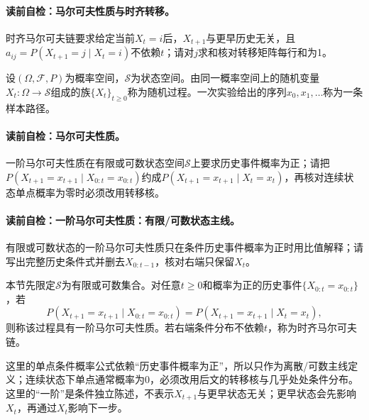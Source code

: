 \paragraph{读前自检：马尔可夫性质与时齐转移。}时齐马尔可夫链要求给定当前$X_t=i$后，$X_{t+1}$与更早历史无关，且$a_{ij}=P(X_{t+1}=j\mid X_t=i)$不依赖$t$；请对$j$求和核对转移矩阵每行和为1。\par

\label{struct:V5-C01-CH07}
\begin{definition}[随机过程]
设$(\Omega,\mathcal F,P)$为概率空间，$\mathcal S$为状态空间。由同一概率空间上的随机变量$X_t:\Omega\to\mathcal S$组成的族$\{X_t\}_{t\ge0}$称为随机过程。一次实验给出的序列$x_0,x_1,\ldots$称为一条样本路径。
\end{definition}

\paragraph{读前自检：马尔可夫性质。}一阶马尔可夫性质在有限或可数状态空间$\mathcal S$上要求历史事件概率为正；请把$P(X_{t+1}=x_{t+1}\mid X_{0:t}=x_{0:t})$约成$P(X_{t+1}=x_{t+1}\mid X_t=x_t)$，再核对连续状态单点概率为零时必须改用转移核。\par

\paragraph{读前自检：一阶马尔可夫性质：有限/可数状态主线。}有限或可数状态的一阶马尔可夫性质只在条件历史事件概率为正时用比值解释；请写出完整历史条件式并删去$X_{0:t-1}$，核对右端只保留$X_t$。\par

\begin{definition}
本节先限定$\mathcal S$为有限或可数集合。对任意$t\ge0$和概率为正的历史事件$\{X_{0:t}=x_{0:t}\}$，若
\begin{equation}\label{eq:V5-C01-markov-property}
P(X_{t+1}=x_{t+1}\mid X_{0:t}=x_{0:t})
=P(X_{t+1}=x_{t+1}\mid X_t=x_t),
\end{equation}
则称该过程具有一阶马尔可夫性质。若右端条件分布不依赖$t$，称为时齐马尔可夫链。
\end{definition}
这里的单点条件概率公式依赖“历史事件概率为正”，所以只作为离散/可数主线定义；连续状态下单点通常概率为$0$，必须改用后文的转移核与几乎处处条件分布。这里的“一阶”是条件独立陈述，不表示$X_{t+1}$与更早状态无关；更早状态会先影响$X_t$，再通过$X_t$影响下一步。

